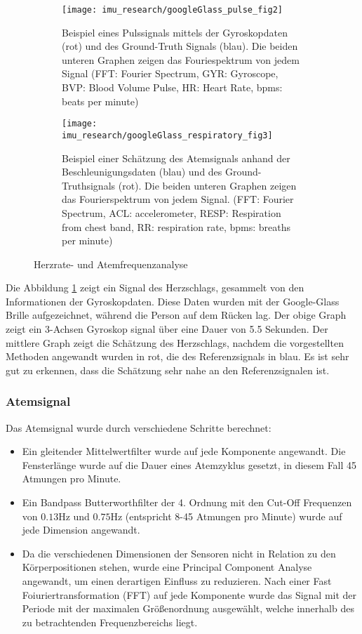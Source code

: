 \begin{figure}[ht]
    \centering
    \begin{subfigure}{.49\textwidth}
        \texttt{[image: imu\_research/googleGlass\_pulse\_fig2]}
      \caption{Beispiel eines Pulssignals mittels der Gyroskopdaten (rot) und des Ground-Truth Signals (blau). Die beiden unteren Graphen zeigen das Fouriespektrum von jedem Signal (FFT: Fourier Spectrum, GYR: Gyroscope, BVP: Blood Volume Pulse, HR: Heart Rate, bpms: beats per minute)}
      \label{background:googleGlass:pulse_wave}
    \end{subfigure}
    \begin{subfigure}{.49\textwidth}
        \texttt{[image: imu\_research/googleGlass\_respiratory\_fig3]}
      \caption{Beispiel einer Schätzung des Atemsignals anhand der Beschleunigungsdaten (blau) und des Ground-Truthsignals (rot). Die beiden unteren Graphen zeigen das Fourierspektrum von jedem Signal. (FFT: Fourier Spectrum, ACL: accelerometer, RESP: Respiration from chest band, RR: respiration rate, bpms: breaths per minute)}
      \label{background:googleGlass:respiratory_wave}
    \end{subfigure}
    \caption{Herzrate- und Atemfrequenzanalyse}
    \label{background:googleGlass}
  \end{figure}

Die Abbildung \ref{background:googleGlass:pulse_wave} zeigt ein Signal des Herzschlags, gesammelt von den Informationen der Gyroskopdaten. Diese Daten wurden mit der Google-Glass Brille aufgezeichnet, während die Person auf dem Rücken lag. Der obige Graph zeigt ein 3-Achsen Gyroskop signal über eine Dauer von 5.5 Sekunden. Der mittlere Graph zeigt die Schätzung des Herzschlags, nachdem die vorgestellten Methoden angewandt wurden in rot, die des Referenzsignals in blau. Es ist sehr gut zu erkennen, dass die Schätzung sehr nahe an den Referenzsignalen ist.

\subsubsection{Atemsignal}
Das Atemsignal wurde durch verschiedene Schritte berechnet:
\begin{itemize}
    \item Ein gleitender Mittelwertfilter wurde auf jede Komponente angewandt. Die Fensterlänge wurde auf die Dauer eines Atemzyklus gesetzt, in diesem Fall 45 Atmungen pro Minute. 
    \item Ein Bandpass Butterworthfilter der 4. Ordnung mit den Cut-Off Frequenzen von $0.13 \si{\hertz}$ und $0.75 \si{\hertz}$ (entspricht 8-45 Atmungen pro Minute) wurde auf jede Dimension angewandt.
    \item Da die verschiedenen Dimensionen der Sensoren nicht in Relation zu den Körperpositionen stehen, wurde eine Principal Component Analyse angewandt, um einen derartigen Einfluss zu reduzieren. Nach einer Fast Foiuriertransformation (FFT) auf jede Komponente wurde das Signal mit der Periode mit der maximalen Größenordnung ausgewählt, welche innerhalb des zu betrachtenden Frequenzbereichs liegt.
\end{itemize}

